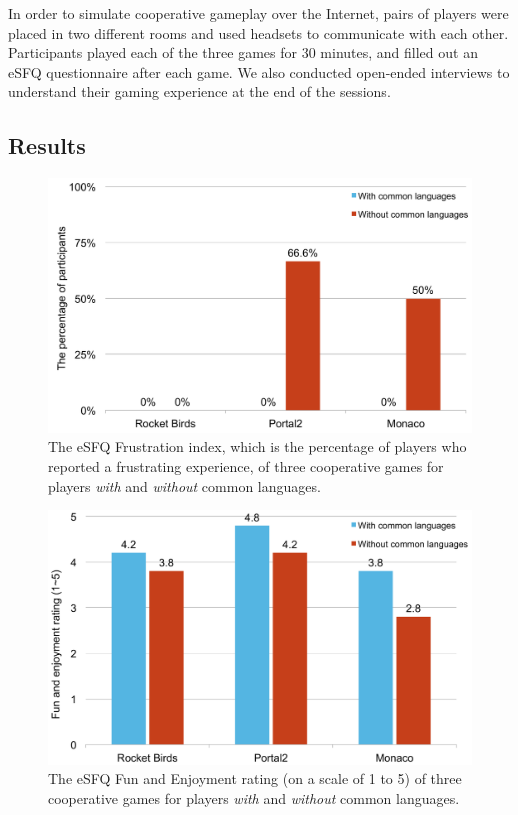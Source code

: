 In order to simulate cooperative gameplay over the Internet, pairs of players were placed in two different rooms and used headsets to communicate with each other. Participants played each of the three games for 30 minutes, and filled out an eSFQ\cite{eSFQ} questionnaire after each game. We also conducted open-ended interviews to understand their gaming experience at the end of the sessions. 



\subsection{Results}

\begin{figure}[!b]
\centering
\includegraphics[width=0.9\columnwidth]{Figures/PS_Frus.pdf}
\caption{The eSFQ Frustration index, which is the percentage of players who reported a frustrating experience, of three cooperative games for players \textit{with} and \textit{without} common languages.}
\label{fig:PS_Frus}
\end{figure}

\begin{figure}[!t]
\centering
\includegraphics[width=0.9\columnwidth]{Figures/PS_FunAndEnj.pdf}
\caption{The eSFQ Fun and Enjoyment rating (on a scale of 1 to 5) of three cooperative games for players \textit{with} and \textit{without} common languages.}
\label{fig:PS_FunAndEnj}
\end{figure}

